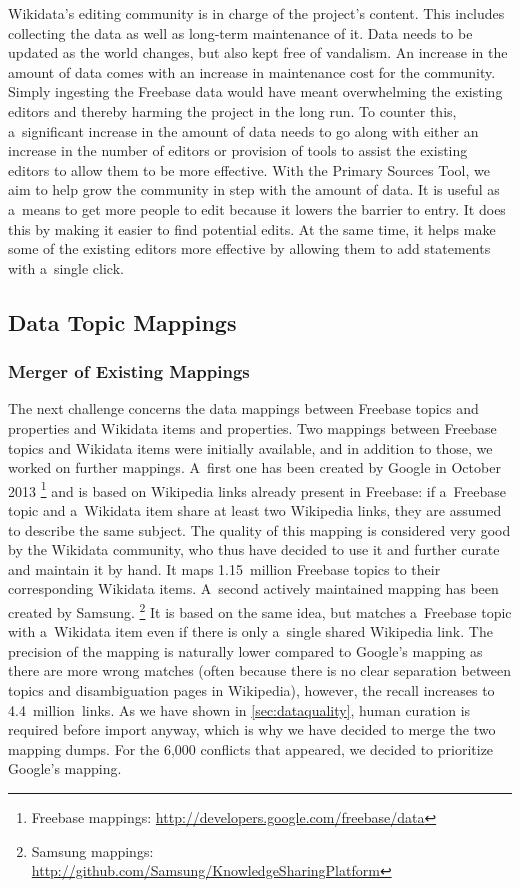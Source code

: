 \documentclass{sig-alternate-2013}
\begin{document}
Wikidata's editing community is in charge of the project's content. This includes collecting the
data as well as long-term maintenance of it. Data needs to be updated as the world changes, but also
kept free of vandalism. An increase in the amount of data comes with an increase in maintenance
cost for the community. Simply ingesting the Freebase data would have meant overwhelming the
existing editors and thereby harming the project in the long run. To counter this, a~significant
increase in the amount of data needs to go along with either an increase in the number of editors
or provision of tools to assist the existing editors to allow them to be more effective. With the
Primary Sources Tool, we aim to help grow the community in step with the amount of data. It is
useful as a~means to get more people to edit because it lowers the barrier to entry. It does this
by making it easier to find potential edits. At the same time, it helps make some of the existing
editors more effective by allowing them to add statements with a~single click.

\subsection{Data Topic Mappings}\label{subsec:topic-mappings}

\subsubsection{Merger of Existing Mappings}

The next challenge concerns the data mappings between Freebase topics and properties
and Wikidata items and properties.
Two mappings between Freebase topics and Wikidata items were initially available,
and in addition to those, we worked on further mappings.
A~first one has been created by Google in October 2013%
\footnote{Freebase mappings: \url{http://developers.google.com/freebase/data}}
and is based on Wikipedia links already present in Freebase: if a~Freebase topic and
a~Wikidata item share at least two Wikipedia links, they are assumed to describe the same subject.
The quality of this mapping is considered very good by the Wikidata community,
who thus have decided to use it and further curate and maintain it by hand.
It maps 1.15~million Freebase topics to their corresponding Wikidata items.
A~second actively maintained mapping has been created by Samsung.%
\footnote{Samsung mappings: \url{http://github.com/Samsung/KnowledgeSharingPlatform}}
It is based on the same idea, but matches a~Freebase topic with a~Wikidata item
even if there is only a~single shared Wikipedia link.
The precision of the mapping is naturally lower compared to Google's mapping
as there are more wrong matches (often because there is no clear separation between topics
and disambiguation pages in Wikipedia), however, the recall increases to 4.4~million~links.
As we have shown in \autoref{sec:dataquality},
human curation is required before import anyway,
which is why we have decided to merge the two mapping dumps.
For the 6,000 conflicts that appeared, we decided to prioritize Google's mapping.
\end{document}

